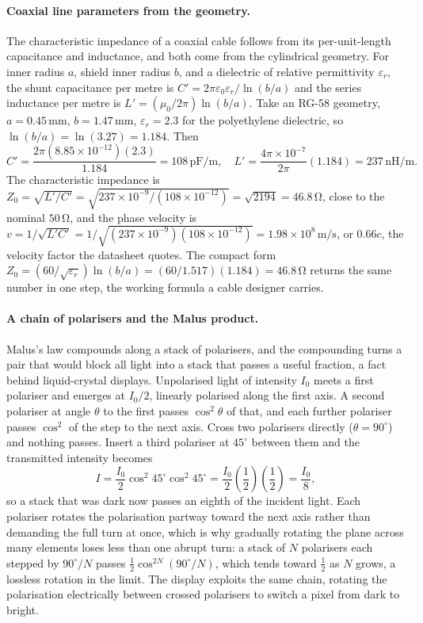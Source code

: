 \paragraph{Coaxial line parameters from the geometry.}
The characteristic impedance of a coaxial cable follows from its
per-unit-length capacitance and inductance, and both come from the cylindrical
geometry. For inner radius $a$, shield inner radius $b$, and a dielectric of
relative permittivity $\varepsilon_r$, the shunt capacitance per metre is
$C' = 2\pi\varepsilon_0\varepsilon_r/\ln(b/a)$ and the series inductance per
metre is $L' = (\mu_0/2\pi)\ln(b/a)$. Take an RG-58 geometry, $a = 0.45\,\si{
\milli\meter}$, $b = 1.47\,\si{\milli\meter}$, $\varepsilon_r = 2.3$ for the
polyethylene dielectric, so $\ln(b/a) = \ln(3.27) = 1.184$. Then
\[
C' = \frac{2\pi(8.85\times 10^{-12})(2.3)}{1.184} = 108\,\si{\pico\farad
\per\meter}, \quad L' = \frac{4\pi\times 10^{-7}}{2\pi}(1.184) =
237\,\si{\nano\henry\per\meter}.
\]
The characteristic impedance is $Z_0 = \sqrt{L'/C'} = \sqrt{237\times
10^{-9}/(108\times 10^{-12})} = \sqrt{2194} = 46.8\,\si{\ohm}$, close to the
nominal $50\,\si{\ohm}$, and the phase velocity is $v = 1/\sqrt{L'C'} =
1/\sqrt{(237\times 10^{-9})(108\times 10^{-12})} = 1.98\times 10^{8}\,\si{
\meter\per\second}$, or $0.66c$, the velocity factor the datasheet quotes.
The compact form $Z_0 = (60/\sqrt{\varepsilon_r})\ln(b/a) = (60/1.517)
(1.184) = 46.8\,\si{\ohm}$ returns the same number in one step, the working
formula a cable designer carries.

\paragraph{A chain of polarisers and the Malus product.}
Malus's law compounds along a stack of polarisers, and the compounding
turns a pair that would block all light into a stack that passes a useful
fraction, a fact behind liquid-crystal displays. Unpolarised light of
intensity $I_0$ meets a first polariser and emerges at $I_0/2$, linearly
polarised along the first axis. A second polariser at angle $\theta$ to the
first passes $\cos^2\theta$ of that, and each further polariser passes
$\cos^2$ of the step to the next axis. Cross two polarisers directly
($\theta = 90^{\circ}$) and nothing passes. Insert a third polariser at
$45^{\circ}$ between them and the transmitted intensity becomes
\[
I = \frac{I_0}{2}\cos^2 45^{\circ}\cos^2 45^{\circ} = \frac{I_0}{2}
\left(\frac{1}{2}\right)\left(\frac{1}{2}\right) = \frac{I_0}{8},
\]
so a stack that was dark now passes an eighth of the incident light. Each
polariser rotates the polarisation partway toward the next axis rather than
demanding the full turn at once, which is why gradually rotating the plane
across many elements loses less than one abrupt turn: a stack of $N$
polarisers each stepped by $90^{\circ}/N$ passes $\tfrac{1}{2}\cos^{2N}
(90^{\circ}/N)$, which tends toward $\tfrac{1}{2}$ as $N$ grows, a lossless
rotation in the limit. The display exploits the same chain, rotating the
polarisation electrically between crossed polarisers to switch a pixel from
dark to bright.

